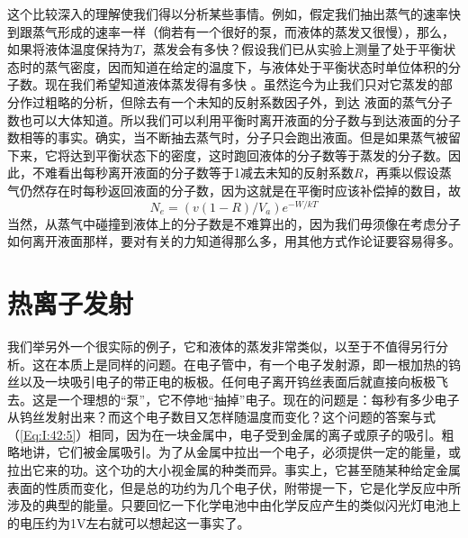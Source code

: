 这个比较深入的理解使我们得以分析某些事情。例如，假定我们抽出蒸气的速率快到跟蒸气形成的速率一样（倘若有一个很好的泵，而液体的蒸发又很慢），那么，如果将液体温度保持为$T$，蒸发会有多快？假设我们已从实验上测量了处于平衡状态时的蒸气密度，因而知道在给定的温度下，与液体处于平衡状态时单位体积的分子数。现在我们希望知道液体蒸发得有多快 。虽然迄今为止我们只对它蒸发的部分作过粗略的分析，但除去有一个未知的反射系数因子外，到达 液面的蒸气分子数也可以大体知道。所以我们可以利用平衡时离开液面的分子数与到达液面的分子数相等的事实。确实，当不断抽去蒸气时，分子只会跑出液面。但是如果蒸气被留下来，它将达到平衡状态下的密度，这时跑回液体的分子数等于蒸发的分子数。因此，不难看出每秒离开液面的分子数等于1减去未知的反射系数$R$，再乘以假设蒸气仍然存在时每秒返回液面的分子数，因为这就是在平衡时应该补偿掉的数目，故
\begin{equation}
    \label{Eq:I:42:5}
    N_e=(v(1-R)/V_a)e^{-W/kT}
\end{equation}
当然，从蒸气中碰撞到液体上的分子数是不难算出的，因为我们毋须像在考虑分子如何离开液面那样，要对有关的力知道得那么多，用其他方式作论证要容易得多。

\section{热离子发射}

我们举另外一个很实际的例子，它和液体的蒸发非常类似，以至于不值得另行分析。这在本质上是同样的问题。在电子管中，有一个电子发射源，即一根加热的钨丝以及一块吸引电子的带正电的板极。任何电子离开钨丝表面后就直接向板极飞去。这是一个理想的“泵”，它不停地“抽掉”电子。现在的问题是：每秒有多少电子从钨丝发射出来？而这个电子数目又怎样随温度而变化？这个问题的答案与式（\ref{Eq:I:42:5}）相同，因为在一块金属中，电子受到金属的离子或原子的吸引。粗略地讲，它们被金属吸引。为了从金属中拉出一个电子，必须提供一定的能量，或拉出它来的功。这个功的大小视金属的种类而异。事实上，它甚至随某种给定金属表面的性质而变化，但是总的功约为几个电子伏，附带提一下，它是化学反应中所涉及的典型的能量。只要回忆一下化学电池中由化学反应产生的类似闪光灯电池上的电压约为1V左右就可以想起这一事实了。

